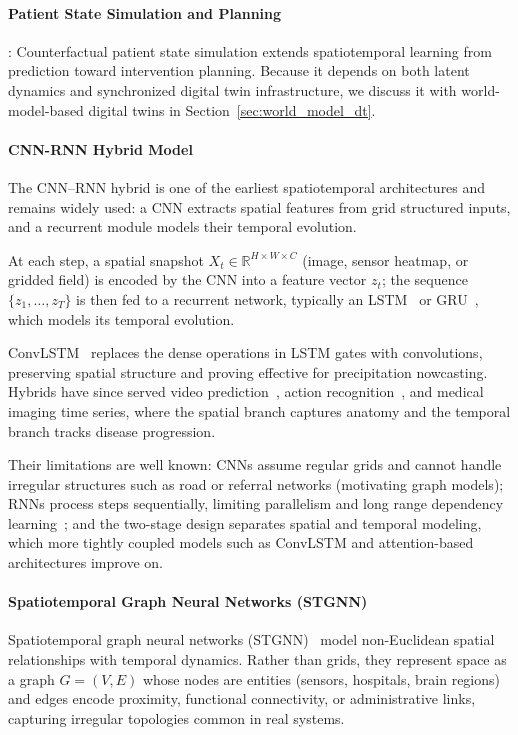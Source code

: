 \documentclass[journal]{IEEEtran}
\begin{document}
\paragraph{Patient State Simulation and Planning}: Counterfactual patient state simulation extends spatiotemporal learning from prediction toward intervention planning. Because it depends on both latent dynamics and synchronized digital twin infrastructure, we discuss it with world-model-based digital twins in Section~\ref{sec:world_model_dt}.

\paragraph{CNN-RNN Hybrid Model}
The CNN--RNN hybrid is one of the earliest spatiotemporal architectures and remains widely used: a CNN extracts spatial features from grid structured inputs, and a recurrent module models their temporal evolution.
 
At each step, a spatial snapshot $X_t \in \mathbb{R}^{H \times W \times C}$ (image, sensor heatmap, or gridded field) is encoded by the CNN into a feature vector $z_t$; the sequence $\{z_1,\ldots,z_T\}$ is then fed to a recurrent network, typically an LSTM~\cite{rnn_lstm} or GRU~\cite{cho2014gru}, which models its temporal evolution.
 
ConvLSTM~\cite{shi2015convolutional} replaces the dense operations in LSTM gates with convolutions, preserving spatial structure and proving effective for precipitation nowcasting. Hybrids have since served video prediction~\cite{srivastava2015unsupervised}, action recognition~\cite{donahue2015longterm}, and medical imaging time series, where the spatial branch captures anatomy and the temporal branch tracks disease progression.
 
Their limitations are well known: CNNs assume regular grids and cannot handle irregular structures such as road or referral networks (motivating graph models); RNNs process steps sequentially, limiting parallelism and long range dependency learning~\cite{bengio1994learning}; and the two-stage design separates spatial and temporal modeling, which more tightly coupled models such as ConvLSTM and attention-based architectures improve on.
 
\paragraph{Spatiotemporal Graph Neural Networks (STGNN)}
Spatiotemporal graph neural networks (STGNN)~\cite{shao2022longterm} model non-Euclidean spatial relationships with temporal dynamics. Rather than grids, they represent space as a graph $G=(V,E)$ whose nodes are entities (sensors, hospitals, brain regions) and edges encode proximity, functional connectivity, or administrative links, capturing irregular topologies common in real systems.
 
\end{document}
